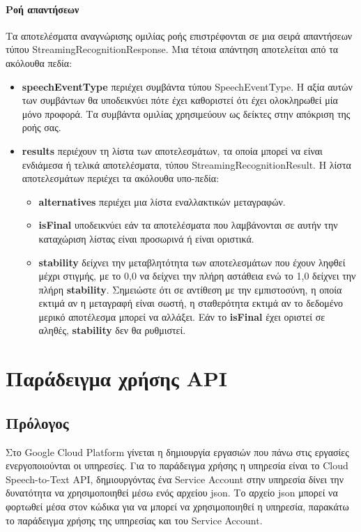 \documentclass[oneside, 12pt]{book}
\begin{document}
\subsubsection{Ροή απαντήσεων}
Τα αποτελέσματα αναγνώρισης ομιλίας ροής επιστρέφονται σε μια σειρά απαντήσεων τύπου StreamingRecognitionResponse. Μια τέτοια απάντηση αποτελείται από τα ακόλουθα πεδία:
\begin{itemize}
  \item \textbf{speechEventType} περιέχει συμβάντα τύπου SpeechEventType. Η αξία αυτών των συμβάντων θα υποδεικνύει πότε έχει καθοριστεί ότι έχει ολοκληρωθεί μία μόνο προφορά. Τα συμβάντα ομιλίας χρησιμεύουν ως δείκτες στην απόκριση της ροής σας.
  \item \textbf{results} περιέχουν τη λίστα των αποτελεσμάτων, τα οποία μπορεί να είναι ενδιάμεσα ή τελικά αποτελέσματα, τύπου StreamingRecognitionResult. Η λίστα αποτελεσμάτων περιέχει τα ακόλουθα υπο-πεδία:
  \begin{itemize}
    \item \textbf{alternatives} περιέχει μια λίστα εναλλακτικών μεταγραφών.
    \item \textbf{isFinal} υποδεικνύει εάν τα αποτελέσματα που λαμβάνονται σε αυτήν την καταχώριση λίστας είναι προσωρινά ή είναι οριστικά.
    \item \textbf{stability} δείχνει την μεταβλητότητα των αποτελεσμάτων που έχουν ληφθεί μέχρι στιγμής, με το 0,0 να δείχνει την πλήρη αστάθεια ενώ το 1,0 δείχνει την πλήρη \textbf{stability}. Σημειώστε ότι σε αντίθεση με την εμπιστοσύνη, η οποία εκτιμά αν η μεταγραφή είναι σωστή, η σταθερότητα εκτιμά αν το δεδομένο μερικό αποτέλεσμα μπορεί να αλλάξει. Εάν το \textbf{isFinal} έχει οριστεί σε αληθές, \textbf{stability} δεν θα ρυθμιστεί.
  \end{itemize}
\end{itemize}
\chapter{Παράδειγμα χρήσης API}\label{ch:παράδειγμα-χρήσης-api}
\section{Πρόλογος}\label{sec:πρόλογος}
Στο Google Cloud Platform γίνεται η δημιουργία εργασιών που πάνω στις εργασίες ενεργοποιούνται οι υπηρεσίες.
Για το παράδειγμα χρήσης η υπηρεσία είναι το Cloud Speech-to-Text API, δημιουργόντας ένα Service Account στην υπηρεσία δίνει την δυνατότητα να χρησιμοποιηθεί μέσω ενός αρχείου json.
Το αρχείο json μπορεί να φορτωθεί μέσα στον κώδικα για να μπορεί να χρησιμοποιηθεί η υπηρεσία, παρακάτω το παράδειγμα χρήσης της υπηρεσίας και του Service Account.
\end{document}
